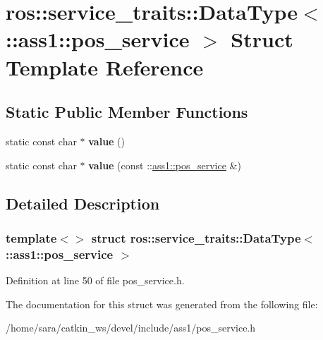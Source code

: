\hypertarget{structros_1_1service__traits_1_1DataType_3_01_1_1ass1_1_1pos__service_01_4}{}\section{ros\+:\+:service\+\_\+traits\+:\+:Data\+Type$<$ \+:\+:ass1\+:\+:pos\+\_\+service $>$ Struct Template Reference}
\label{structros_1_1service__traits_1_1DataType_3_01_1_1ass1_1_1pos__service_01_4}
\subsection*{Static Public Member Functions}
\begin{DoxyCompactItemize}
\item 
\mbox{\label{structros_1_1service__traits_1_1DataType_3_01_1_1ass1_1_1pos__service_01_4_a5f9f20ff9d91709947215a21b2d9d016}} 
static const char $\ast$ {\bfseries value} ()
\item 
\mbox{\label{structros_1_1service__traits_1_1DataType_3_01_1_1ass1_1_1pos__service_01_4_a555f19c50b90a2183b64290cbb84130a}} 
static const char $\ast$ {\bfseries value} (const \+::\hyperlink{structass1_1_1pos__service}{ass1\+::pos\+\_\+service} \&)
\end{DoxyCompactItemize}


\subsection{Detailed Description}
\subsubsection*{template$<$$>$\newline
struct ros\+::service\+\_\+traits\+::\+Data\+Type$<$ \+::ass1\+::pos\+\_\+service $>$}



Definition at line 50 of file pos\+\_\+service.\+h.



The documentation for this struct was generated from the following file\+:\begin{DoxyCompactItemize}
\item 
/home/sara/catkin\+\_\+ws/devel/include/ass1/pos\+\_\+service.\+h\end{DoxyCompactItemize}
